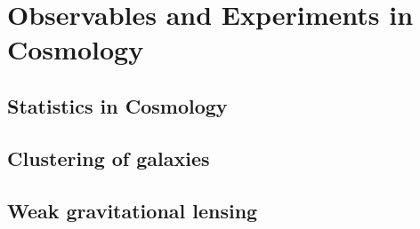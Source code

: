 \chapter{Observables and Experiments in Cosmology} %

\label{ObsExp} %




\section{Statistics in Cosmology}



\section{Clustering of galaxies}



\section{Weak gravitational lensing}

